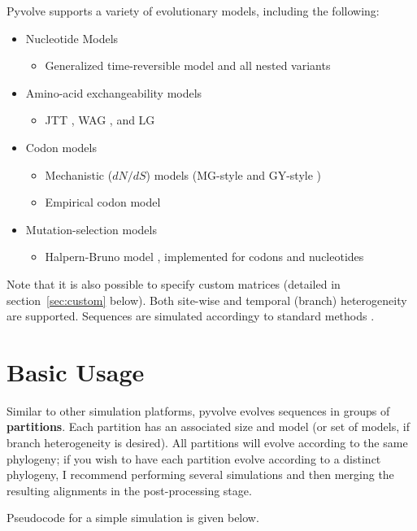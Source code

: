 \documentclass{article}
\begin{document}
Pyvolve supports a variety of evolutionary models, including the following:
\begin{itemize}
	\item Nucleotide Models 
	\begin{itemize}
		\item Generalized time-reversible model \cite{GTR} and all nested variants
	\end{itemize}
	\item Amino-acid exchangeability models 
	\begin{itemize}
		\item JTT \cite{JTT}, WAG \cite{WAG}, and LG \cite{LG}
	\end{itemize}
	\item Codon models
	\begin{itemize}
		\item Mechanistic ($dN/dS$) models (MG-style \cite{MG94} and GY-style \cite{GY94})
		\item Empirical codon model \cite{ECM}
	\end{itemize}
	\item Mutation-selection models
	\begin{itemize}
		\item Halpern-Bruno model \cite{HB98}, implemented for codons and nucleotides
	\end{itemize}
\end{itemize}
Note that it is also possible to specify custom matrices (detailed in section~\ref{sec:custom} below). Both site-wise and temporal (branch) heterogeneity are supported. Sequences are simulated accordingy to standard methods \cite{Yang2006}.



\section{Basic Usage}

Similar to other simulation platforms, pyvolve evolves sequences in groups of \textbf{partitions}. Each partition has an associated size and model (or set of models, if branch heterogeneity is desired). All partitions will evolve according to the same phylogeny; if you wish to have each partition evolve according to a distinct phylogeny, I recommend performing several simulations and then merging the resulting alignments in the post-processing stage. 

Pseudocode for a simple simulation is given below.
\end{document}
